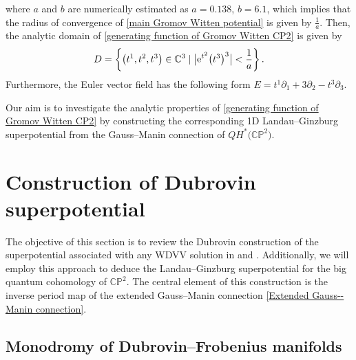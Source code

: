 \documentclass[11pt]{article}
\numberwithin{equation}{section}
\numberwithin{equation}{section}
\begin{document}
where $a$ and $b$ are numerically estimated as
$a = 0.138$, $ b = 6.1$,
which implies that the radius of convergence of \eqref{main Gromov Witten potential} is given by $\frac{1}{a}$. Then, the analytic domain of \eqref{generating function of Gromov Witten CP2} is given by
\begin{gather}\label{WDVV domain}
D = \left\{\bigl(t^1, t^2, t^3\bigr) \in \mathbb{C}^3 \mid \big|{\rm e}^{t^2}\bigl(t^3\bigr)^3\big| < \frac{1}{a}\right\}.
\end{gather}
Furthermore, the Euler vector field has the following form
$E = t^1\partial_1 + 3\partial_2 - t^3\partial_3$.

Our aim is to investigate the analytic properties of \eqref{generating function of Gromov Witten CP2} by constructing the corresponding 1D Landau--Ginzburg superpotential from the Gauss--Manin connection of $QH^{*}\bigl(\mathbb{CP}^2\bigr)$.



\section{Construction of Dubrovin superpotential}\label{Construction of Dubrovin superpotential}

The objective of this section is to review the Dubrovin construction of the superpotential associated with any WDVV solution in \cite[Appendix J]{B.Dubrovin2} and \cite[Chapter 5]{B.Dubrovin3}. Additionally, we will employ this approach to deduce the Landau--Ginzburg superpotential for the big quantum cohomology of $\mathbb{CP}^2$. The central element of this construction is the inverse period map of the extended Gauss--Manin connection \eqref{Extended Gauss--Manin connection}.

\subsection{Monodromy of Dubrovin--Frobenius manifolds}
\end{document}
